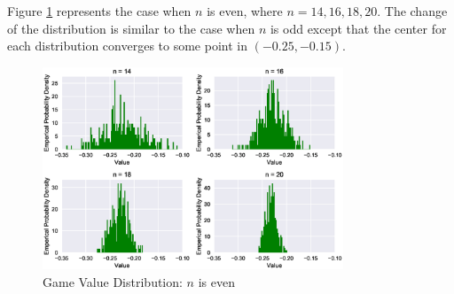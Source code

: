 \documentclass[a4paper,english]{article}
\begin{document}
\begin{spacing}{1.4}
Figure \ref{distribution-even} represents the case when $n$ is even, where $n = 14, 16, 18, 20$. The change of the distribution is similar to the case when $n$ is odd except that the center for each distribution converges to some point in $(-0.25, -0.15)$.

\begin{figure}[!htb]
\centering
\includegraphics[width=0.8\textwidth]{figures/plot3.eps}
\caption{Game Value Distribution: $n$ is even}
\label{distribution-even}
\end{figure}


\end{spacing}
\end{document}
